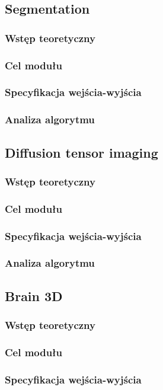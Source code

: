 \documentclass[12]{article}
\begin{document}
	\subsection{Segmentation}
		\subsubsection{Wstęp teoretyczny}
		\subsubsection{Cel modułu}
		\subsubsection{Specyfikacja wejścia-wyjścia}
		\subsubsection{Analiza algorytmu}
		\newpage
	\subsection{Diffusion tensor imaging}
		\subsubsection{Wstęp teoretyczny}
		\subsubsection{Cel modułu}
		\subsubsection{Specyfikacja wejścia-wyjścia}
		\subsubsection{Analiza algorytmu}
		\newpage
	\subsection{Brain 3D}
		\subsubsection{Wstęp teoretyczny}
		\subsubsection{Cel modułu}
		\subsubsection{Specyfikacja wejścia-wyjścia}
\end{document}
